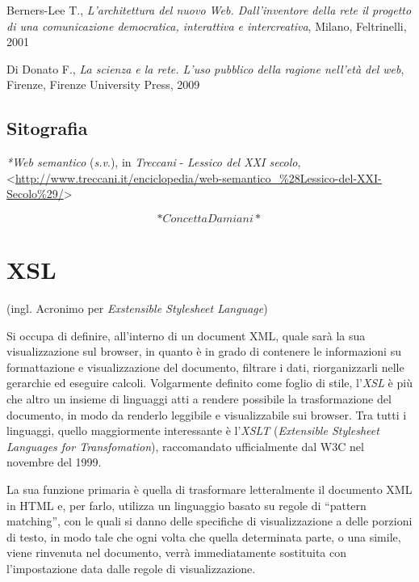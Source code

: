 \documentclass[
  b5paper,
  twoside,
  11pt,
  chapterprefix=false,
  bibliography=totocnumbered,
  listof=flat]{scrbook}
\begin{document}
Berners-Lee T., \emph{L'architettura del nuovo Web. Dall'inventore della
rete il progetto di una comunicazione democratica, interattiva e
intercreativa}, Milano, Feltrinelli, 2001

Di Donato F., \emph{La scienza e la rete. L'uso pubblico della ragione
nell'età del web}, Firenze, Firenze University Press, 2009

\hypertarget{sitografia-30}{%
\section*{Sitografia}\label{sitografia-30}}

\emph{*Web semantico} (\emph{s.v}.), in \emph{Treccani} - \emph{Lessico del XXI secolo},
\textless{}\href{http://www.treccani.it/enciclopedia/web-semantico_\%28Lessico-del-XXI-Secolo\%29/}{{http://www.treccani.it/enciclopedia/web-semantico\_\%28Lessico-del-XXI-Secolo\%29/}}\textgreater{}

\[*Concetta Damiani*\]

\hypertarget{xsl}{%
\chapter{XSL}\label{xsl}}

(ingl. Acronimo per \emph{Exstensible Stylesheet Language})

Si occupa di definire, all'interno di un document XML, quale sarà la sua
visualizzazione sul browser, in quanto è in grado di contenere le
informazioni su formattazione e visualizzazione del documento, filtrare
i dati, riorganizzarli nelle gerarchie ed eseguire calcoli. Volgarmente
definito come foglio di stile, l'\emph{XSL} è più che altro un insieme di
linguaggi atti a rendere possibile la trasformazione del documento, in
modo da renderlo leggibile e visualizzabile sui browser. Tra tutti i
linguaggi, quello maggiormente interessante è l'\emph{XSLT} (\emph{Extensible
Stylesheet Languages for Transfomation}), raccomandato ufficialmente dal
W3C nel novembre del 1999.

La sua funzione primaria è quella di trasformare letteralmente il
documento XML in HTML e, per farlo, utilizza un linguaggio basato su
regole di \enquote{pattern matching}, con le quali si danno delle specifiche di
visualizzazione a delle porzioni di testo, in modo tale che ogni volta
che quella determinata parte, o una simile, viene rinvenuta nel
documento, verrà immediatamente sostituita con l'impostazione data dalle
regole di visualizzazione.
\end{document}
